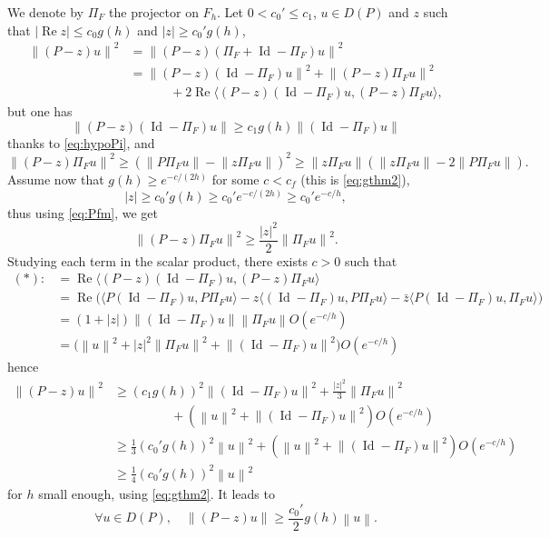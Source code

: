 \documentclass[12pt]{amsart}
\renewcommand{\Re}{\operatorname{Re}}
\newcommand{\Id}{\operatorname{Id}}
\def\<{\langle}
\def\>{\rangle}
\numberwithin{equation}{section}
\numberwithin{figure}{section}
\newcommand{\vvert}[1]{\left\lVert#1\right\rVert}
\begin{document}
We denote by $\Pi_F$ the projector on $F_h$. Let $0<c_0'\leq c_1$, $u\in D(P)$ and $z$ such that $|\Re z|\leq c_0g(h)$ and $|z|\geq c_0'g(h)$,
\begin{equation*}
\begin{aligned}
    \vvert{(P-z)u}^2 &= \vvert{(P-z)(\Pi_F+\Id-\Pi_F)u}^2\\
    &= \vvert{(P-z)(\Id-\Pi_F)u}^2+\vvert{(P-z)\Pi_F u}^2\\&\phantom{*****}+2\Re\<(P-z)(\Id-\Pi_F)u,(P-z)\Pi_F u\>,
\end{aligned}
\end{equation*}
but one has
\begin{equation*}
\vvert{(P-z)(\Id-\Pi_F)u} \geq c_1g(h)\vvert{(\Id-\Pi_F)u}
\end{equation*}
thanks to \eqref{eq:hypoPi}, and 
\begin{equation*}
\vvert{(P-z)\Pi_F u}^2 \geq (\vvert{P\Pi_F u}-\vvert{z\Pi_F u})^2 \geq \vvert{z\Pi_F u}(\vvert{z\Pi_F u}-2\vvert{P\Pi_F u}).
\end{equation*}
Assume now that $g(h)\geq e^{-c/(2h)}$ for some $c<c_f$ (this is \eqref{eq:gthm2}),
\begin{equation*}
|z|\geq c_0'g(h)\geq c_0'e^{-c/(2h)}\geq c_0'e^{-c/h},
\end{equation*}
thus using \eqref{eq:Pfm}, we get
\begin{equation*}
\vvert{(P-z)\Pi_F u}^2 \geq \frac{|z|^2}{2}\vvert{\Pi_F u}^2.
\end{equation*}
Studying each term in the scalar product, there exists $c>0$ such that
\begin{equation*}
\begin{aligned}
    (\ast) :&= \Re\<(P-z)(\Id-\Pi_F)u,(P-z)\Pi_F u\>\\
    &= \Re\big(\<P(\Id-\Pi_F)u,P\Pi_F u\>-z\<(\Id-\Pi_F)u,P\Pi_F u\> - \bar{z}\<P(\Id-\Pi_F)u,\Pi_F u\>\big)\\
    &= (1+|z|)\vvert{(\Id-\Pi_F)u}\vvert{\Pi_F u}O(e^{-c/h})\\
    &= \Big(\vvert{u}^2+|z|^2\vvert{\Pi_F u}^2+\vvert{(\Id-\Pi_F)u}^2\Big)O(e^{-c/h})
\end{aligned}
\end{equation*}
hence
\begin{equation*}
\begin{aligned}
    \vvert{(P-z)u}^2 &\geq (c_1g(h))^2\vvert{(\Id-\Pi_F)u}^2 + \frac{|z|^2}3\vvert{\Pi_F u}^2\\
    &\phantom{*******}+(\vvert{u}^2+\vvert{(\Id-\Pi_F)u}^2)O(e^{-c/h})\\
    &\geq \frac13(c_0'g(h))^2\vvert{u}^2+(\vvert{u}^2+\vvert{(\Id-\Pi_F)u}^2)O(e^{-c/h})\\
    &\geq \frac14(c_0'g(h))^2\vvert{u}^2
\end{aligned}
\end{equation*}
for $h$ small enough, using \eqref{eq:gthm2}. It leads to
\begin{equation}\label{eq:injectivePz}
\forall u\in D(P),\quad\vvert{(P-z)u} \geq \frac{c_0'}{2}g(h)\vvert{u}.
\end{equation}
\end{document}
